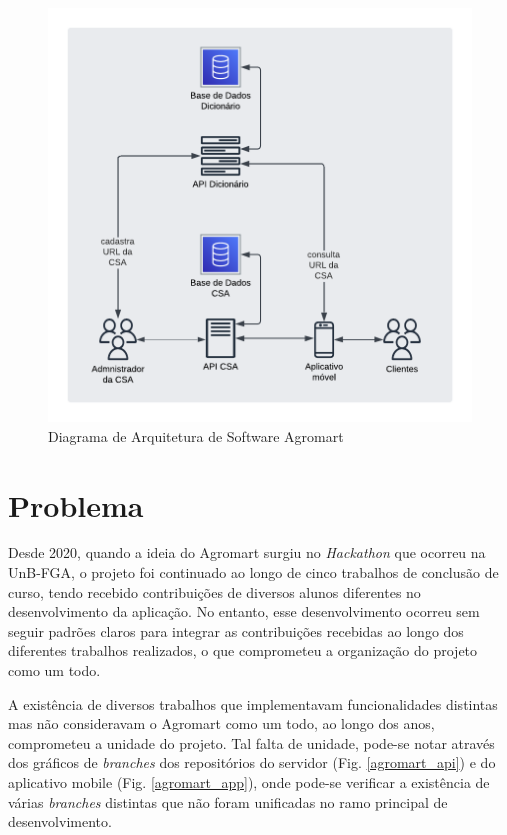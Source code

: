 \begin{figure}[h]
	\centering
	\includegraphics[keepaspectratio=true,scale=0.8]{figuras/diagrama_arquitetura.png}
	\caption{Diagrama de Arquitetura de Software Agromart}
	\label{diagrama_arquitetura}
\end{figure}

\section{Problema}
Desde 2020, quando a ideia do Agromart surgiu no \textit{Hackathon} que ocorreu na UnB-FGA, o projeto foi continuado ao longo de cinco trabalhos de conclusão de curso, tendo recebido contribuições de diversos alunos diferentes no desenvolvimento da aplicação. No entanto, esse desenvolvimento ocorreu sem seguir padrões claros para integrar as contribuições recebidas ao longo dos diferentes trabalhos realizados, o que comprometeu a organização do projeto como um todo.

A existência de diversos trabalhos que implementavam funcionalidades distintas mas não consideravam o Agromart como um todo, ao longo dos anos, comprometeu a unidade do projeto. Tal falta de unidade, pode-se notar através dos gráficos de \textit{branches} dos repositórios do servidor (Fig. \ref{agromart_api}) e do aplicativo mobile (Fig. \ref{agromart_app}), onde pode-se verificar a existência de várias \textit{branches} distintas que não foram unificadas no ramo principal de desenvolvimento. 


